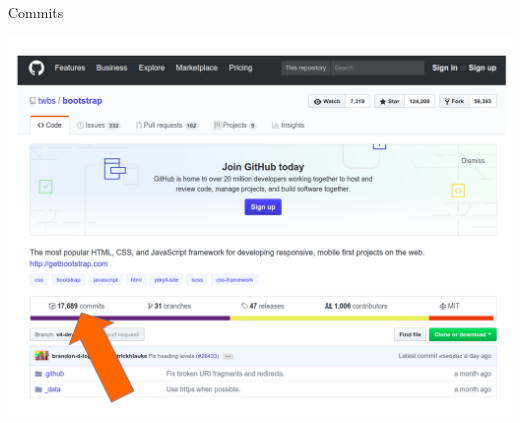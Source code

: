 \documentclass{beamer}
\begin{document}
\begin{frame}{Commits}
  \begin{center}
       
\includegraphics[height=0.7\paperheight]{commits_projeto.png} \\
      \end{center}
 
\end{frame}
\end{document}

